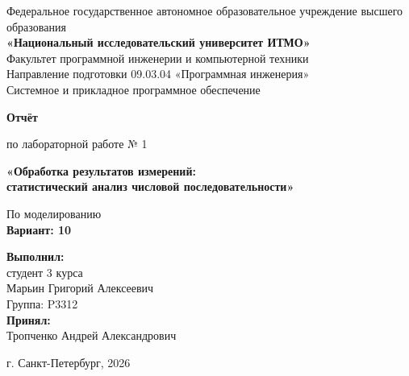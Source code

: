 \documentclass[12pt,a4paper]{article}
\begin{document}
\begin{titlepage}
  \centering
  Федеральное государственное автономное образовательное\newline
  учреждение высшего образования\\[3mm]
  \textbf{«Национальный исследовательский университет ИТМО»}\\[5mm]
  Факультет программной инженерии и компьютерной техники\\[3mm]
  Направление подготовки 09.03.04 «Программная инженерия»\\
  Системное и прикладное программное обеспечение

  \vfill
  {\Large\bfseries Отчёт\par}
  \vspace{4mm}
  {\large по лабораторной работе № 1\par}
  \vspace{4mm}
  {\large\bfseries «Обработка результатов измерений:\\
  статистический анализ числовой последовательности»\par}
  \vspace{4mm}
  По моделированию\\[3mm]
  \textbf{Вариант: 10}
  \vfill

  \begin{flushright}
    \begin{minipage}{0.61\textwidth}
      \raggedleft
      \textbf{Выполнил:}\\
      студент 3 курса\\
      Марьин Григорий Алексеевич\\
      Группа: P3312\\[4mm]
      \textbf{Принял:}\\
      Тропченко Андрей Александрович\\[6mm]
    \end{minipage}
  \end{flushright}

  \vfill
  г. Санкт-Петербург, 2026
\end{titlepage}
\end{document}
